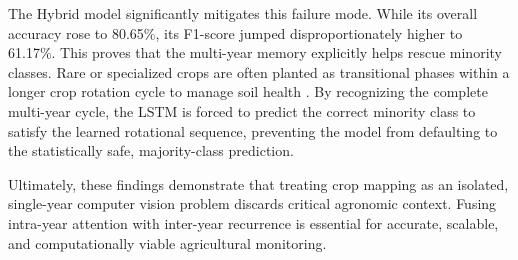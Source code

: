 The Hybrid model significantly mitigates this failure mode. While its overall accuracy rose to 80.65\%, its F1-score jumped disproportionately higher to 61.17\%.
This proves that the multi-year memory explicitly helps rescue minority classes.
Rare or specialized crops are often planted as transitional phases within a longer crop rotation cycle to manage soil health \cite{crop_rotation, osman_crop_2013}.
By recognizing the complete multi-year cycle, the LSTM is forced to predict the correct minority class to satisfy the learned rotational sequence,
preventing the model from defaulting to the statistically safe, majority-class prediction.

Ultimately, these findings demonstrate that treating crop mapping as an isolated, single-year computer vision problem discards critical agronomic context.
Fusing intra-year attention with inter-year recurrence is essential for accurate, scalable, and computationally viable agricultural monitoring.